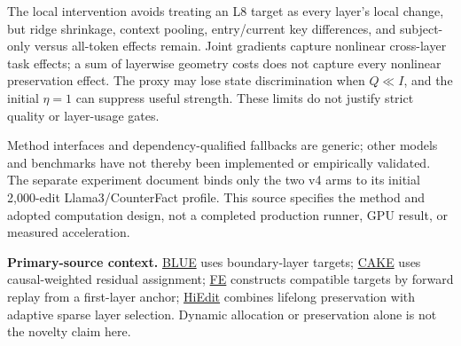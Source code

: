 \documentclass[11pt]{article}
\begin{document}
The local intervention avoids treating an L8 target as every layer's local
change, but ridge shrinkage, context pooling, entry/current key differences,
and subject-only versus all-token effects remain. Joint gradients capture
nonlinear cross-layer task effects; a sum of layerwise geometry costs does
not capture every nonlinear preservation effect. The proxy may lose state
discrimination when $Q\ll I$, and the initial $\eta=1$ can suppress useful
strength. These limits do not justify strict quality or layer-usage gates.

Method interfaces and dependency-qualified fallbacks are generic; other
models and benchmarks have not thereby been implemented or empirically
validated. The separate experiment document binds only the two v4 arms to
its initial 2,000-edit Llama3/CounterFact profile. This source specifies the
method and adopted computation design, not a completed production runner,
GPU result, or measured acceleration.

\textbf{Primary-source context.}
\href{https://papers.neurips.cc/paper_files/paper/2025/file/70d4ef44dc973586cfa3ea92b4868b72-Paper-Conference.pdf}{BLUE}
uses boundary-layer targets;
\href{https://aclanthology.org/2026.acl-long.918.pdf}{CAKE}
uses causal-weighted residual assignment;
\href{https://arxiv.org/html/2605.00358v2}{FE}
constructs compatible targets by forward replay from a first-layer anchor;
\href{https://aclanthology.org/2026.acl-long.1855.pdf}{HiEdit}
combines lifelong preservation with adaptive sparse layer selection.
Dynamic allocation or preservation alone is not the novelty claim here.
\end{document}
